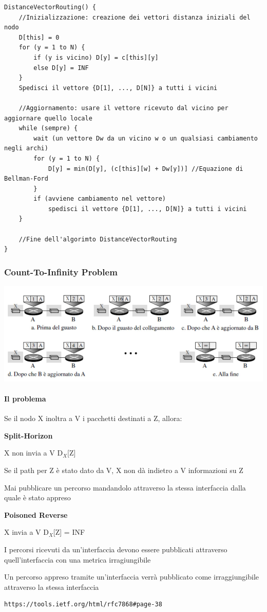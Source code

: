 \documentclass[10pt]{article}
\begin{document}
\begin{lstlisting}
DistanceVectorRouting() {
	//Inizializzazione: creazione dei vettori distanza iniziali del nodo
	D[this] = 0
	for (y = 1 to N) {
		if (y is vicino) D[y] = c[this][y]
		else D[y] = INF
	}
	Spedisci il vettore {D[1], ..., D[N]} a tutti i vicini
	
	//Aggiornamento: usare il vettore ricevuto dal vicino per aggiornare quello locale
	while (sempre) {
		wait (un vettore Dw da un vicino w o un qualsiasi cambiamento negli archi)
		for (y = 1 to N) {
			D[y] = min(D[y], (c[this][w] + Dw[y])] //Equazione di Bellman-Ford
		}
		if (avviene cambiamento nel vettore)
			spedisci il vettore {D[1], ..., D[N]} a tutti i vicini
	}
	
	//Fine dell'algorimto DistanceVectorRouting
}
\end{lstlisting}
\pagebreak
\subsubsection{Count-To-Infinity Problem}
\begin{center}
\includegraphics[scale=0.7]{counttoinfinity.png}
\end{center}
\paragraph{Il problema} Se il nodo X inoltra a V i pacchetti destinati a Z, allora:
\begin{list}{}{}
\item \textbf{Split-Horizon}
\begin{list}{}{}
\item X non invia a V D$_X$[Z]
\item Se il path per Z è stato dato da V, X non dà indietro a V informazioni su Z
\item Mai pubblicare un percorso mandandolo attraverso la stessa interfaccia dalla quale è stato appreso
\end{list}
\item \textbf{Poisoned Reverse}
\begin{list}{}{}
\item X invia a V D$_X$[Z] = INF
\item I percorsi ricevuti da un'interfaccia devono essere pubblicati attraverso quell'interfaccia con una metrica irragiungibile
\item Un percorso appreso tramite un'interfaccia verrà pubblicato come irraggiungibile attraverso la stessa interfaccia
\item \begin{verbatim}
https://tools.ietf.org/html/rfc7868#page-38
\end{verbatim}
\end{list}
\end{list}
\end{document}
